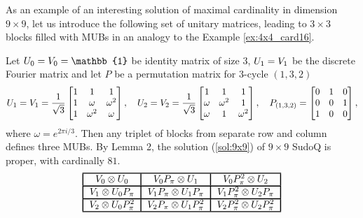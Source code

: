 \documentclass[aps,onecolumn,floatfix,superscriptaddress]{revtex4}
\begin{document}
As an example of an interesting solution of maximal cardinality in dimension $9 \times 9$, let us introduce the following set of unitary matrices, leading to $3 \times 3$ blocks filled with MUBs in an analogy to the Example \ref{ex:4x4_card16}. 
\begin{example}
Let $\mathnormal{U}_0=\mathnormal{V}_0=\mathbb{1}$ be identity matrix of size $3$,  $\mathnormal{U}_1=\mathnormal{V}_1$ be the discrete Fourier matrix and let $P$ be a permutation matrix for $3$-cycle $(1,3,2)$
\[
\mathnormal{U}_1=\mathnormal{V}_1=
\frac{1}{\sqrt{3}}
\begin{bmatrix}
    1 & 1 & 1 \\
    1 & \omega & \omega^2 \\
    1 & \omega^2 & \omega
\end{bmatrix},
    \quad    
    \mathnormal{U}_2=\mathnormal{V}_2=
\frac{1}{\sqrt{3}}
\begin{bmatrix}
    1 & 1 & 1 \\
    \omega & \omega^2 & 1 \\
    \omega & 1 & \omega^2
\end{bmatrix}, 
    \quad
P_{(1,3,2)} = 
\begin{bmatrix}
    0 & 1 & 0 \\
    0 & 0 & 1 \\
    1 & 0 & 0
\end{bmatrix},
\]
where $\omega=e^{2\pi i/3}$. Then any triplet of blocks from separate row and column defines three MUBs. By Lemma 2, the solution (\ref{sol:9x9}) of $9\times9$ SudoQ is proper, with cardinally $81$. 
\begin{equation}\label{sol:9x9}
\begin{tabular}{!{\vrule width 1pt}c!{\vrule width 1pt}c!{\vrule width 1pt}c!{\vrule width 1pt}c!{\vrule width 1pt}c!{\vrule width 1pt}}
    \noalign{\hrule height 1pt}
    $\mathnormal{V}_0\otimes\mathnormal{U}_0$ & $\mathnormal{V}_0\mathnormal{P}_\pi\otimes\mathnormal{U}_1$ & $\mathnormal{V}_0\mathnormal{P}_\pi^2\otimes\mathnormal{U}_2$ \tabularnewline
    \noalign{\hrule height 1pt}
    $\mathnormal{V}_1\otimes\mathnormal{U}_0\mathnormal{P}_\pi$ & $\mathnormal{V}_1\mathnormal{P}_\pi\otimes\mathnormal{U}_1\mathnormal{P}_\pi$ & $\mathnormal{V}_1\mathnormal{P}_\pi^2\otimes\mathnormal{U}_2\mathnormal{P}_\pi$ \tabularnewline
    \noalign{\hrule height 1pt}
    $\mathnormal{V}_2\otimes\mathnormal{U}_0\mathnormal{P}_\pi^2$ & $\mathnormal{V}_2\mathnormal{P}_\pi\otimes\mathnormal{U}_1\mathnormal{P}_\pi^2$ & $\mathnormal{V}_2\mathnormal{P}_\pi^2\otimes\mathnormal{U}_2\mathnormal{P}_\pi^2$ \tabularnewline
    \noalign{\hrule height 1pt}
    \end{tabular}
\end{equation}
\end{example}
\end{document}
